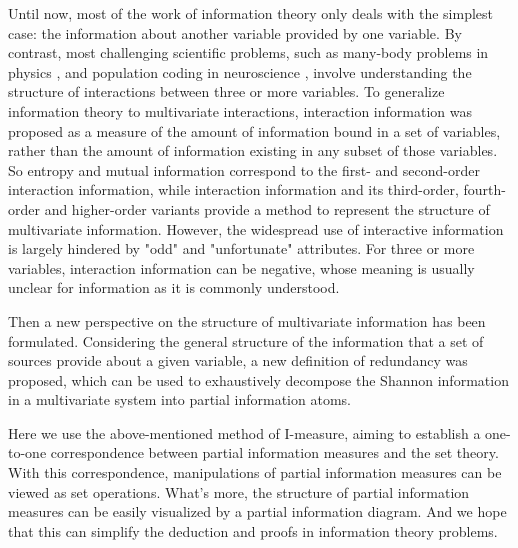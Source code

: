 Until now, most of the work of information theory only deals with the simplest case: the information about another variable provided by one variable. By contrast, most challenging scientific problems, such as many-body problems in physics \cite{belyaev1959many}, and population coding in neuroscience \cite{Dayan2001Theoretical,Rieke1996Spikes}, involve understanding the structure of interactions between three or more variables. To generalize information theory to multivariate interactions, interaction information was proposed as a measure of the amount of information bound in a set of variables, rather than the amount of information existing in any subset of those variables.  So entropy and mutual information correspond to the first- and second-order interaction information, while interaction information and its third-order, fourth-order and higher-order variants provide a method to represent the structure of multivariate information. However, the widespread use of interactive information is largely hindered by "odd" and "unfortunate" attributes. For three or more variables, interaction information can be negative, whose meaning is usually unclear for information as it is commonly understood.

Then a new perspective on the structure of multivariate information has been formulated.\cite{Williams2010Nonnegative} Considering the general structure of the information that a set of sources provide about a given variable, a new definition of redundancy was proposed, which can be used to exhaustively decompose the Shannon information in a multivariate system into partial information atoms.

Here we use the above-mentioned method of I-measure, aiming to establish a one-to-one correspondence between partial information measures and the set theory. With this correspondence, manipulations of partial information measures can be viewed as set operations. What’s more, the structure of partial information measures can be easily visualized by a partial information diagram. And we hope that this can simplify the deduction and  proofs in information theory problems.
